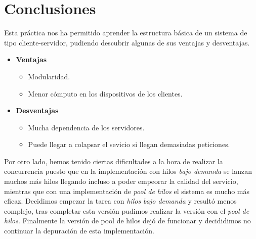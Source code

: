 \documentclass[10pt, spanish, pdftex]{template/UC3M_document}
\begin{document}
\newpage


\section{Conclusiones}
Esta práctica nos ha permitido aprender la estructura básica de un sistema de tipo cliente-servidor, pudiendo descubrir algunas de sus ventajas y desventajas.

\begin{itemize}
  \item \textbf{Ventajas}
    \begin{itemize}
      \item Modularidad.
      \item Menor cómputo en los dispositivos de los clientes.
    \end{itemize}
  \item \textbf{Desventajas}
  \begin{itemize}
    \item Mucha dependencia de los servidores.
    \item Puede llegar a colapsar el sevicio si llegan demasiadas peticiones.
  \end{itemize}
\end{itemize}

Por otro lado, hemos tenido ciertas dificultades a la hora de realizar la concurrencia puesto que en la implementación con hilos \textit{bajo demanda} se lanzan muchos más hilos llegando incluso a poder empeorar la calidad del servicio, mientras que con una implementación de \textit{pool de hilos} el sistema es mucho más eficaz. Decidimos empezar la tarea con \textit{hilos bajo demanda} y resultó menos complejo, tras completar esta versión pudimos realizar la versión con el \textit{pool de hilos}. Finalmente la versión de pool de hilos dejó de funcionar y decididimos no continuar la depuración de esta implementación.
\end{document}
